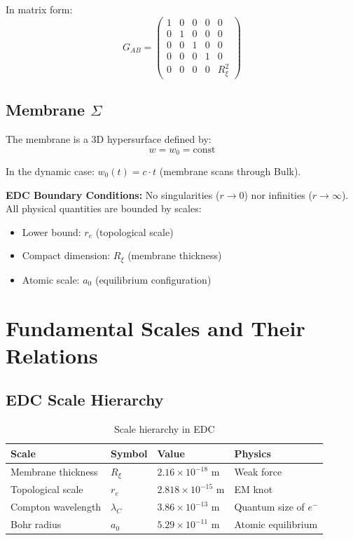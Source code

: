 \documentclass[12pt,a4paper]{article}
\begin{document}
In matrix form:
\begin{equation}
G_{AB} = \begin{pmatrix} 
1 & 0 & 0 & 0 & 0 \\ 
0 & 1 & 0 & 0 & 0 \\ 
0 & 0 & 1 & 0 & 0 \\ 
0 & 0 & 0 & 1 & 0 \\ 
0 & 0 & 0 & 0 & R_\xi^2 
\end{pmatrix}
\end{equation}

\subsection{Membrane $\Sigma$}

The membrane is a 3D hypersurface defined by:
\begin{equation}
w = w_0 = \text{const}
\end{equation}

In the dynamic case: $w_0(t) = c \cdot t$ (membrane scans through Bulk).

\begin{edcprinciple}
\textbf{EDC Boundary Conditions:} No singularities ($r \to 0$) nor infinities ($r \to \infty$).
All physical quantities are bounded by scales:
\begin{itemize}
    \item Lower bound: $r_e$ (topological scale)
    \item Compact dimension: $R_\xi$ (membrane thickness)
    \item Atomic scale: $a_0$ (equilibrium configuration)
\end{itemize}
\end{edcprinciple}

\section{Fundamental Scales and Their Relations}

\subsection{EDC Scale Hierarchy}

\begin{table}[h]
\centering
\begin{tabular}{@{}llll@{}}
\toprule
\textbf{Scale} & \textbf{Symbol} & \textbf{Value} & \textbf{Physics} \\
\midrule
Membrane thickness & $R_\xi$ & $2.16 \times 10^{-18}$ m & Weak force \\
Topological scale & $r_e$ & $2.818 \times 10^{-15}$ m & EM knot \\
Compton wavelength & $\lambda_C$ & $3.86 \times 10^{-13}$ m & Quantum size of $e^-$ \\
Bohr radius & $a_0$ & $5.29 \times 10^{-11}$ m & Atomic equilibrium \\
\bottomrule
\end{tabular}
\caption{Scale hierarchy in EDC}
\end{table}
\end{document}
